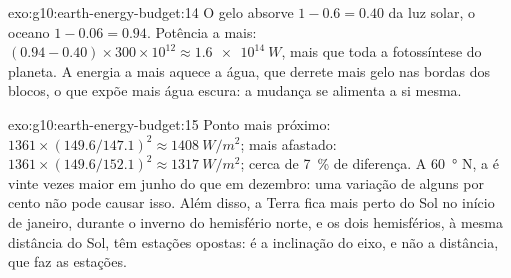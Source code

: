 \begin{solution}{exo:g10:earth-energy-budget:14}
O gelo absorve $1 - 0.6 = 0.40$ da luz solar, o oceano $1 - 0.06 =
0.94$. Potência a mais: $(0.94 - 0.40) \times 300 \times 10^{12} \approx
\qty{1.6e14}{W}$, mais que toda a fotossíntese do planeta. A energia a mais
aquece a água, que derrete mais gelo nas bordas dos blocos, o que expõe mais
água escura: a mudança se alimenta a si mesma.
\end{solution}

\begin{solution}{exo:g10:earth-energy-budget:15}
Ponto mais próximo: $1361 \times (149.6/147.1)^2 \approx \qty{1408}{W/m^2}$;
mais afastado: $1361 \times (149.6/152.1)^2 \approx \qty{1317}{W/m^2}$;
cerca de \qty{7}{\percent} de diferença. A \qty{60}{\degree} N, a 
é vinte vezes maior em junho do que em dezembro: uma variação de alguns por
cento não pode causar isso. Além disso, a Terra fica mais perto do Sol no
início de janeiro, durante o inverno do hemisfério norte, e os dois
hemisférios, à mesma distância do Sol, têm estações opostas: é a
inclinação do eixo, e não a distância, que faz as estações.
\end{solution}

